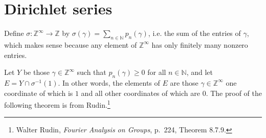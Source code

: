 \documentclass{article}
\begin{document}
\section{Dirichlet series}
Define $\sigma:\mathbb{Z}^\infty \to \mathbb{Z}$ by $\sigma(\gamma) = \sum_{n \in \mathbb{N}} p_n(\gamma)$, i.e. the sum of the entries of $\gamma$, which makes
sense because any element of $\mathbb{Z}^\infty$ has only finitely many nonzero entries. 

Let $Y$ be those $\gamma\in \mathbb{Z}^\infty$ such that $p_n(\gamma) \geq 0$ for all $n \in \mathbb{N}$,
and let $E = Y \cap \sigma^{-1}(1)$. 
 In other words, the elements of $E$ are those $\gamma \in \mathbb{Z}^\infty$ one coordinate of which is $1$ and all other coordinates of which are $0$.
The proof of the following theorem is from Rudin.\footnote{Walter Rudin, {\em Fourier Analysis on Groups}, p.~224, Theorem 8.7.9.}
\end{document}
